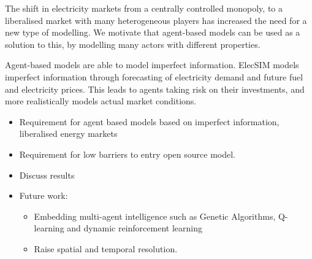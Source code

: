 
The shift in electricity markets from a centrally controlled monopoly, to a liberalised market with many heterogeneous players has increased the need for a new type of modelling. We motivate that agent-based models can be used as a solution to this, by modelling many actors with different properties. 

Agent-based models are able to model imperfect information. ElecSIM models imperfect information through forecasting of electricity demand and future fuel and electricity prices. This leads to agents taking risk on their investments, and more realistically models actual market conditions.

\begin{itemize}
	\item Requirement for agent based models based on imperfect information, liberalised energy markets
	\item Requirement for low barriers to entry open source model.
	\item Discuss results
	\item Future work:
	\begin{itemize}
		\item Embedding multi-agent intelligence such as Genetic Algorithms,  Q-learning and dynamic reinforcement learning
		\item Raise spatial and temporal resolution.
	\end{itemize}
\end{itemize}

